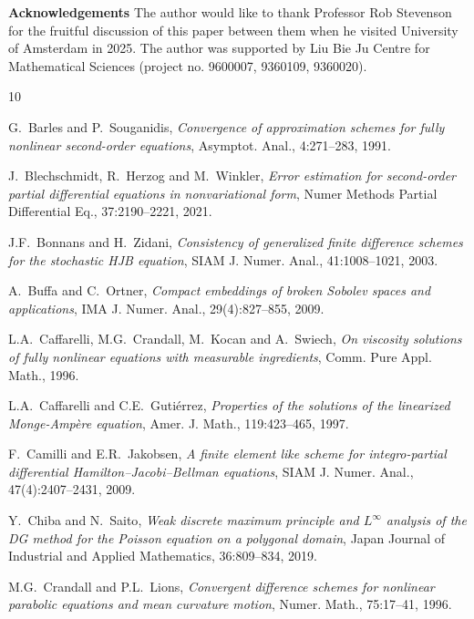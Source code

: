 \documentclass[12pt]{amsart}
\theoremstyle{definition}
\theoremstyle{remark}
\begin{document}
{\bf Acknowledgements} The author would like to thank Professor Rob Stevenson for the fruitful discussion 
of this paper between them when he visited University of Amsterdam in 2025. The author was supported by 
Liu Bie Ju Centre for Mathematical Sciences (project no. 9600007, 9360109, 9360020).



\begin{thebibliography}{10}

{\sc G.~Barles and P.~Souganidis}, {\em Convergence of approximation schemes 
for fully nonlinear second-order equations},  Asymptot. Anal., 4:271--283, 1991.

{\sc J.~Blechschmidt, R.~Herzog and M.~Winkler}, {\em Error estimation for second-order 
partial differential equations in nonvariational form}, 
Numer Methods Partial Differential Eq., 37:2190--2221, 2021.

{\sc J.F.~Bonnans and H.~Zidani}, {\em Consistency of generalized finite difference schemes for the stochastic HJB equation}, 
SIAM J. Numer. Anal., 41:1008--1021, 2003.

{\sc A.~Buffa and C.~Ortner}, {\em Compact embeddings of broken Sobolev spaces and applications}, 
IMA J. Numer. Anal., 29(4):827--855, 2009.

{\sc L.A.~Caffarelli, M.G.~Crandall, M.~Kocan and A.~Swiech}, {\em On viscosity solutions 
of fully nonlinear equations with measurable ingredients}, Comm. Pure Appl. Math., 1996.

{\sc L.A.~Caffarelli and C.E.~Guti\'{e}rrez}, {\em Properties of the solutions of the linearized 
Monge-Amp\`{e}re equation}, Amer. J. Math., 119:423--465, 1997.

{F.~Camilli and E.R.~Jakobsen}, {\em A finite element like scheme for 
integro-partial differential Hamilton–Jacobi–Bellman equations}, 
SIAM J. Numer. Anal., 47(4):2407--2431, 2009.
  
{\sc Y.~Chiba and N.~Saito}, {\em Weak discrete maximum principle and $L^{\infty}$ analysis
of the DG method for the Poisson equation on a polygonal domain}, 
Japan Journal of Industrial and Applied Mathematics, 36:809--834, 2019.

{\sc M.G.~Crandall and P.L.~Lions}, {\em Convergent difference schemes for 
nonlinear parabolic equations and mean curvature motion}, Numer. Math., 
75:17--41, 1996.
  

\end{thebibliography}
\end{document}
